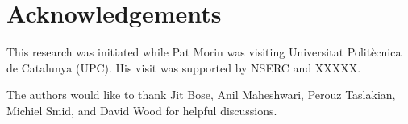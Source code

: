 \documentclass[lotsofwhite]{patmorin}
\begin{document}
\section*{Acknowledgements}

This research was initiated while Pat Morin was visiting Universitat
Polit\`ecnica de Catalunya (UPC).  His visit was supported by NSERC
and XXXXX.  

The authors would like to thank Jit Bose, Anil Maheshwari, Perouz
Taslakian, Michiel Smid, and David Wood for helpful discussions.



\end{document}
